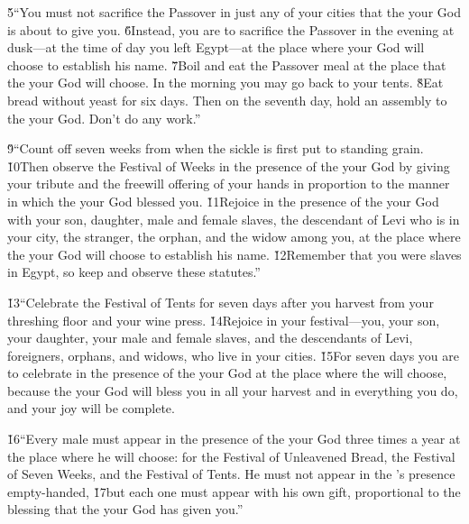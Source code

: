 \v{5}``You must not sacrifice the Passover in just any of your cities that the  your God is about to give you. \v{6}Instead, you are to sacrifice the Passover in the evening at dusk---at the time of day you left Egypt---at the place where your God will choose to establish his name. \v{7}Boil and eat the Passover meal at the place that the  your God will choose. In the morning you may go back to your tents. \v{8}Eat bread without yeast for six days. Then on the seventh day, hold an assembly to the  your God. Don't do any work.''

\v{9}``Count off seven weeks from when the sickle is first put to standing grain. \v{10}Then observe the Festival of Weeks in the presence of the  your God by giving your tribute and the freewill offering of your hands in proportion to the manner in which the  your God blessed you. \v{11}Rejoice in the presence of the  your God with your son, daughter, male and female slaves, the descendant of Levi who is in your city, the stranger, the orphan, and the widow among you, at the place where the  your God will choose to establish his name. \v{12}Remember that you were slaves in Egypt, so keep and observe these statutes.''

\v{13}``Celebrate the Festival of Tents for seven days after you harvest from your threshing floor and your wine press. \v{14}Rejoice in your festival---you, your son, your daughter, your male and female slaves, and the descendants of Levi, foreigners, orphans, and widows, who live in your cities. \v{15}For seven days you are to celebrate in the presence of the  your God at the place where the  will choose, because the  your God will bless you in all your harvest and in everything you do, and your joy will be complete.

\v{16}``Every male must appear in the presence of the  your God three times a year at the place where he will choose: for the Festival of Unleavened Bread, the Festival of Seven Weeks, and the Festival of Tents. He must not appear in the 's presence empty-handed, \v{17}but each one must appear with his own gift, proportional to the blessing that the  your God has given you.''

